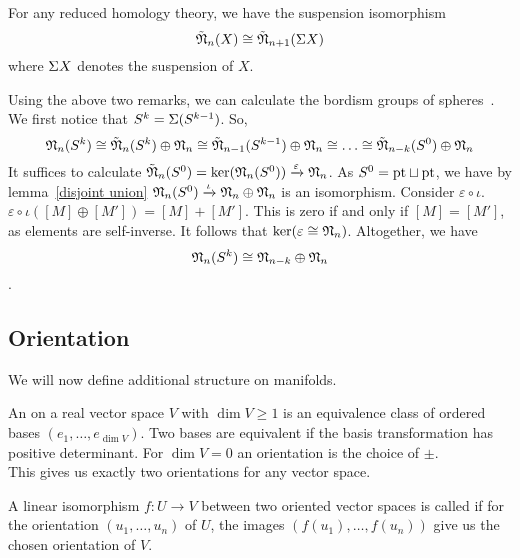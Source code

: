 \documentclass[a4paper,11pt]{article}
\begin{document}
\begin{remark}
    For any reduced homology theory, we have the suspension isomorphism \[\tilde{\mathfrak{N}}_n(X)\cong\tilde{\mathfrak{N}}_{n+1}(\Sigma X)\]
    where \(\Sigma X\) denotes the suspension of \(X\).
\end{remark}

Using the above two remarks, we can calculate the bordism groups of spheres\ \cite[Proposition 6.1]{zhang}. We first notice that \(S^k=\Sigma(S^{k-1})\). So,
\[\mathfrak{N}_n(S^k)\cong\tilde{\mathfrak{N}}_n(S^k)\oplus\mathfrak{N}_n\cong\tilde{\mathfrak{N}}_{n-1}(S^{k-1})\oplus\mathfrak{N}_n\cong\dots\cong\tilde{\mathfrak{N}}_{n-k}(S^0)\oplus\mathfrak{N}_n\]
It suffices to calculate \(\tilde{\mathfrak{N}}_n(S^0)=\ker(\mathfrak{N}_n(S^0))\xrightarrow{\varepsilon}\mathfrak{N}_n\). As \(S^0=\mathrm{pt}\sqcup\mathrm{pt}\), we have by lemma\ \ref{disjoint union} \(\mathfrak{N}_n(S^0)\xrightarrow{\iota}\mathfrak{N}_n\oplus\mathfrak{N}_n\) is an isomorphism. 
Consider \(\varepsilon\circ\iota\).\ \(\varepsilon\circ\iota([M]\oplus[M'])=[M]+[M']\). This is zero if and only if \([M]=[M']\), as elements are self-inverse. It follows that \(\ker(\varepsilon\cong\mathfrak{N}_n)\). 
Altogether, we have \[\mathfrak{N}_n(S^k)\cong\mathfrak{N}_{n-k}\oplus\mathfrak{N}_n\].

\subsection{Orientation}\label{Kap Orientation}

We will now define additional  structure on manifolds.


\begin{definition}%
    An  on a real vector space \(V\) with \(\dim V\geq 1\) is an equivalence class of ordered bases \((e_1,\dots,e_{\dim V})\). Two bases are equivalent if the basis transformation has positive determinant. 
    For \(\dim V=0\) an orientation is the choice of \(\pm\).\\
    This gives us exactly two orientations for any vector space.
\end{definition}

\begin{definition}
    A linear isomorphism \(f:U\to V\) between two oriented vector spaces is called  if for the orientation \((u_1,\dots,u_n)\) of \(U\), the images \((f(u_1),\dots,f(u_n))\) give us the chosen orientation of \(V\).
\end{definition}
\end{document}
